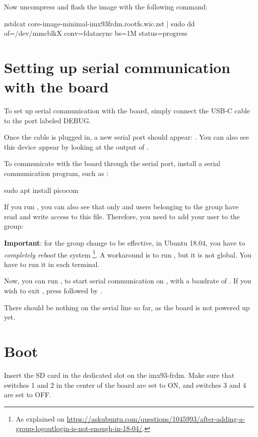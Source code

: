 Now uncompress and flash the image with the following command:
\begin{bashinput}
zstdcat core-image-minimal-imx93frdm.rootfs.wic.zst | sudo dd of=/dev/mmcblkX conv=fdatasync bs=1M status=progress
\end{bashinput}

\section{Setting up serial communication with the board}
To set up serial communication with the board, simply connect the USB-C cable to the port labeled DEBUG. 

Once the cable is plugged in, a new serial port
should appear: .  You can also see this device
appear by looking at the output of .

To communicate with the board through the serial port, install a
serial communication program, such as :

\begin{bashinput}
sudo apt install picocom
\end{bashinput}

If you run , you can also see that only
 and users belonging to the  group have
read and write access to this file. Therefore, you need to add your user
to the  group:


{\bf Important}: for the group change to be effective, in Ubuntu 18.04, you have to
{\em completely reboot} the system \footnote{As explained on
\url{https://askubuntu.com/questions/1045993/after-adding-a-group-logoutlogin-is-not-enough-in-18-04/}.}.
A workaround is to run , but it is not global.
You have to run it in each terminal.

Now, you can run , to start serial
communication on , with a baudrate of . If
you wish to exit , press \code{[Ctrl][a]} followed by
\code{[Ctrl][x]}.

There should be nothing on the serial line so far, as the board is not
powered up yet.

\section{Boot}
Insert the SD card in the dedicated slot on the imx93-frdm. Make sure that switches 1 and 2 in the center of the board are set to ON, and switches 3 and 4 are set to OFF.

